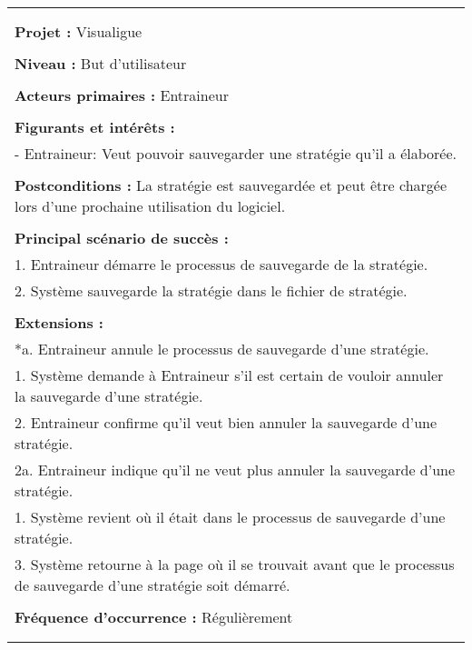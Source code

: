 \begin{longtable}{|p{16cm}|}
\newpage
\begin{flushleft}
	\textbf{Cas d'utilisation 2 : Sauvegarder une stratégie}\\
\end{flushleft}
\begin{tabular}{|p{16cm}|}
	\hline
	\\
	\textbf{Projet :} Visualigue\\
	\\
	\textbf{Niveau :} But d'utilisateur\\
	\\
	\textbf{Acteurs primaires :} Entraineur\\
	\\
	\textbf{Figurants et intérêts :} \\
	- Entraineur: Veut pouvoir sauvegarder une stratégie qu'il a élaborée.\\
	\\
	\textbf{Postconditions :} La stratégie est sauvegardée et peut être chargée lors d'une prochaine utilisation du logiciel.\\
	\\
	\textbf{Principal scénario de succès :}\\
	1. Entraineur démarre le processus de sauvegarde de la stratégie.\\
	2. Système sauvegarde la stratégie dans le fichier de stratégie.\\
	\\
	\textbf{Extensions :}\\
	*a. Entraineur annule le processus de sauvegarde d'une stratégie.\\
	\hspace{1cm}1. Système demande à Entraineur s'il est certain de vouloir annuler la sauvegarde d'une stratégie.\\
	\hspace{1cm}2. Entraineur confirme qu'il veut bien annuler la sauvegarde d'une stratégie.\\
	\hspace{2cm}2a. Entraineur indique qu'il ne veut plus annuler la sauvegarde d'une stratégie.\\
	\hspace{3cm}1. Système revient où il était dans le processus de sauvegarde d'une stratégie.\\
	\hspace{1cm}3. Système retourne à la page où il se trouvait avant que le processus de sauvegarde d'une stratégie soit démarré.\\
	\\
	\textbf{Fréquence d'occurrence :} Régulièrement\\
	\\
	\hline
\end{tabular}



\end{longtable}
